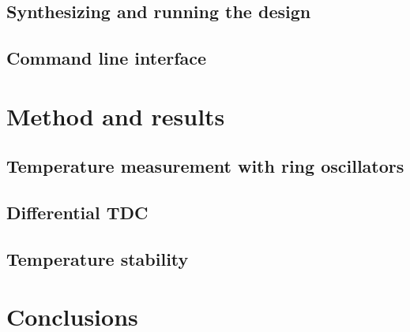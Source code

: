 \documentclass[a4paper,11pt]{article}
\begin{document}
\subsection{Synthesizing and running the design}

\subsection{Command line interface}

\section{Method and results}

\subsection{Temperature measurement with ring oscillators}





\subsection{Differential TDC}

\subsection{Temperature stability}

\section{Conclusions}
\end{document}
